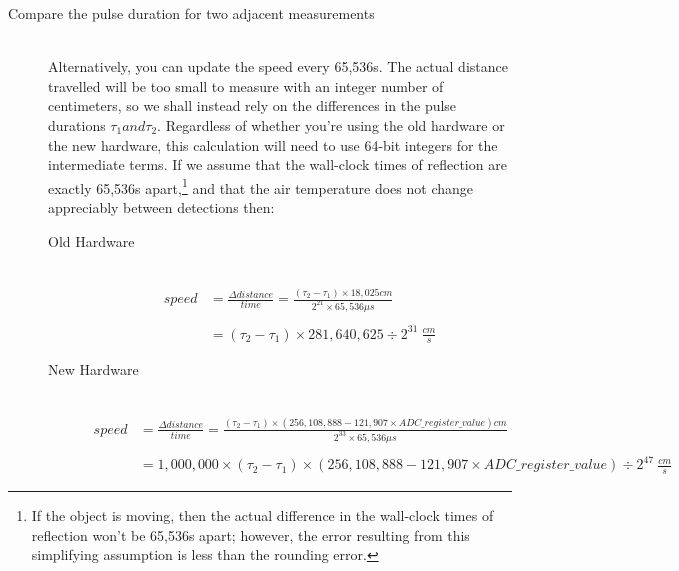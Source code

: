 \begin{description}
    \item[Compare the pulse duration for two adjacent measurements] \phantom{ } \\
        Alternatively, you can update the speed every 65,536\textmu s.
        The actual distance travelled will be too small to measure with an integer number of centimeters, so we shall instead rely on the differences in the pulse durations $\tau_1 and \tau_2$.
        Regardless of whether you're using the old hardware or the new hardware, this calculation will need to use 64-bit integers for the intermediate terms.
        If we assume that the wall-clock times of reflection are exactly 65,536\textmu s apart,\footnote{
            If the object is moving, then the actual difference in the wall-clock times of reflection won't be 65,536\textmu s apart; however, the error resulting from this simplifying assumption is less than the rounding error.
        } and that the air temperature does not change appreciably between detections then:
            \begin{description}
                \item[Old Hardware] \phantom{ } \\
                    \begin{align*}
                        speed & = \frac{\Delta distance}{time} %
                          = \frac{\left( \tau_2 - \tau_1 \right) \times 18,025 cm}{2^{21} \times 65,536\mu s} \\
                        & \\
                        & =  \left( \tau_2 - \tau_1 \right) \times 281,640,625 \div 2^{31} \ \frac{cm}{s}
                    \end{align*}
                \item[New Hardware] \phantom{ } \\
                    \begin{align*}
                        speed & = \frac{\Delta distance}{time} = \frac{\left( \tau_2 - \tau_1 \right) \times \left( 256,108,888 - 121,907 \times ADC\_register\_value \right) cm}{2^{33} \times 65,536\mu s} \\
                        & \\
                        & =  1,000,000 \times \left( \tau_2 - \tau_1 \right) \times \left( 256,108,888 - 121,907 \times ADC\_register\_value \right) \div 2^{47} \ \frac{cm}{s}
                    \end{align*}
            \end{description}
\end{description}

